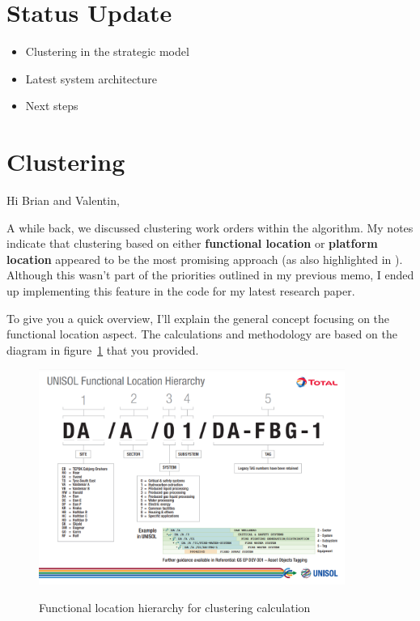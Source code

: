 \section{Status Update}

\begin{itemize}
	\item Clustering in the strategic model
	\item Latest system architecture
	\item Next steps
\end{itemize}

\section{Clustering}
% 

Hi Brian and Valentin,

A while back, we discussed clustering work orders within the
algorithm. My notes indicate that clustering based on either \textbf{functional location}
or \textbf{platform location} appeared to be the most promising approach (as also highlighted in \citep{palmerMaintenancePlanningScheduling2019weeklyscheduling}). Although
this wasn’t part of the priorities outlined in my previous memo, I ended up
implementing this feature in the code for my latest research paper.

To give you a quick overview, I'll explain the general concept focusing on the
functional location aspect. The calculations and methodology are based on the
diagram in figure~\ref{fig:functional-location} that you provided.

\begin{figure}[H]
	\centering
	\includegraphics[width=10cm]{../../../figures/total-figures/functional_location_total.png}\label{fig:functional-location}
	\caption{Functional location hierarchy for clustering calculation}
\end{figure}

